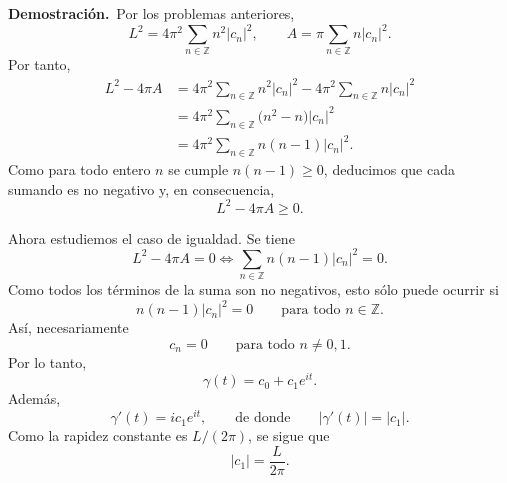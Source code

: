\documentclass[11pt,letterpaper]{article}
\newcommand{\Z}{\mathbb{Z}}
\begin{document}
\textbf{Demostración.}\,
Por los problemas anteriores,
\begin{equation*}
    L^2=4\pi^2\sum_{n\in\Z}n^2|c_n|^2,
    \qquad
    A=\pi\sum_{n\in\Z}n|c_n|^2.
\end{equation*}
Por tanto,
\begin{align*}
    L^2-4\pi A
    &=4\pi^2\sum_{n\in\Z}n^2|c_n|^2
      -4\pi^2\sum_{n\in\Z}n|c_n|^2 \\
    &=4\pi^2\sum_{n\in\Z}\bigl(n^2-n\bigr)|c_n|^2 \\
    &=4\pi^2\sum_{n\in\Z}n(n-1)|c_n|^2.
\end{align*}
Como para todo entero $n$ se cumple $n(n-1)\ge 0$, deducimos que cada sumando es no negativo y, en consecuencia,
\begin{equation*}
    L^2-4\pi A\ge 0.
\end{equation*}

Ahora estudiemos el caso de igualdad. Se tiene
\begin{equation*}
    L^2-4\pi A=0
    \iff
    \sum_{n\in\Z}n(n-1)|c_n|^2=0.
\end{equation*}
Como todos los términos de la suma son no negativos, esto sólo puede ocurrir si
\begin{equation*}
    n(n-1)|c_n|^2=0
    \qquad\text{para todo } n\in\Z.
\end{equation*}
Así, necesariamente
\begin{equation*}
    c_n=0
    \qquad\text{para todo } n\neq 0,1.
\end{equation*}
Por lo tanto,
\begin{equation*}
    \gamma(t)=c_0+c_1e^{it}.
\end{equation*}
Además,
\begin{equation*}
    \gamma'(t)=ic_1e^{it},
\qquad\text{de donde}\qquad
    |\gamma'(t)|=|c_1|.
\end{equation*}
Como la rapidez constante es $L/(2\pi)$, se sigue que
\begin{equation*}
    |c_1|=\frac{L}{2\pi}.
\end{equation*}
\end{document}
